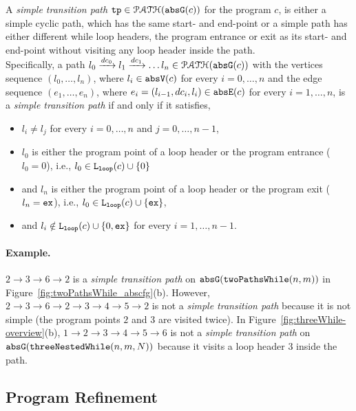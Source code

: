 \begin{defn}
  \label{def:tpath}
A \emph{simple transition path}
$\mathtt{tp} \in \mathcal{PATH}(\mathtt{abs}{\mathtt{G}}(c))$ for the program $c$, is either a simple cyclic path, which has the same start- and end-point
or a simple path has either different while loop headers, the program entrance or exit as its start- and end-point
without visiting any loop header inside the path.
\\
Specifically, a path $l_0 \xrightarrow{dc_0} l_1 \xrightarrow{dc_1} \ldots l_n \in \mathcal{PATH}(\mathtt{abs}{\mathtt{G}}(c))$ with the
vertices sequence $(l_0, \ldots, l_n)$, where $l_i \in \mathtt{abs}{\mathtt{V}}(c)$ for every $i = 0, \ldots, n$ and
%
the edge sequence $(e_1, \ldots, e_n)$, where $e_i = (l_{i - 1}, dc_i, l_{i}) \in \mathtt{abs}{\mathtt{E}}(c)$ for every $i = 1, \ldots, n$,
%
is a \emph{simple transition path} if and only if it satisfies,
\begin{itemize}
  \item $l_i \neq l_j$ for every $i = 0, \ldots, n$ and $j = 0, \ldots, {n - 1}$,
  \item $l_0$ is either the program point of a loop header or the program entrance ($l_0 = 0$),
  i.e., $l_0 \in \mathtt{L}_{\mathtt{loop}}(c) \cup \{ 0 \}$
  \item and $l_n$ is either the program point of a loop header or the program exit ($l_n = \mathtt{ex}$),
  i.e., $l_0 \in \mathtt{L}_{\mathtt{loop}}(c) \cup \{ \mathtt{ex} \}$,
  \item and $l_i \notin \mathtt{L}_{\mathtt{loop}}(c) \cup \{ 0, \mathtt{ex} \}$ for every $i = 1, \ldots, n-1$.
\end{itemize}
\end{defn}

\paragraph{Example.}
$2 \to 3 \to 6 \to 2$ is a \emph{simple transition path} on $\mathtt{abs}{\mathtt{G}}(\mathtt{twoPathsWhile}(n, m))$ in Figure~\ref{fig:twoPathsWhile_abscfg}(b).
However, $2 \to 3 \to 6 \to 2 \to 3 \to 4 \to 5 \to 2$ is not a \emph{simple transition path} because it is not simple (the program points $2$ and $3$ are visited twice).
In Figure~\ref{fig:threeWhile-overview}(b), $1 \to 2 \to 3 \to 4 \to 5 \to 6$ is not a \emph{simple transition path} on $\mathtt{abs}{\mathtt{G}}(\mathtt{threeNestedWhile}(n, m, N))$ because it visits a loop header $3$ inside the path.

\subsection{Program Refinement}
